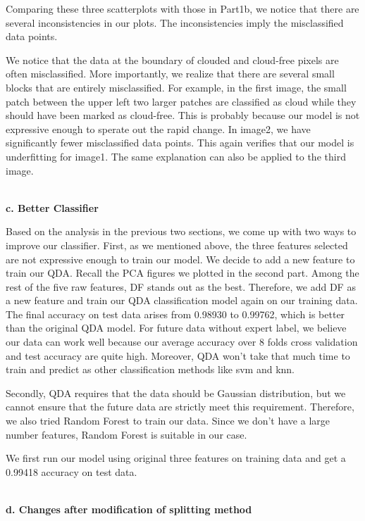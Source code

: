 \documentclass[11pt]{article}
\begin{document}
Comparing these three scatterplots with those in Part1b, we notice that there are several inconsistencies in our plots. The inconsistencies imply the misclassified data points. 

We notice that the data at the boundary of clouded and cloud-free pixels are often misclassified. More importantly, we realize that there are several small blocks that are entirely misclassified. For example, in the first image, the small patch between the upper left two larger patches are classified as cloud while they should have been marked as cloud-free. This is probably because our model is not expressive enough to sperate out the rapid change. In image2, we have significantly fewer misclassified data points. This again verifies that our model is underfitting for image1. The same explanation can also be applied to the third image.


\vspace{0.3cm}
\mbox{}\\
\textbf{c. Better Classifier}

Based on the analysis in the previous two sections, we come up with two ways to improve our classifier.
First, as we mentioned above, the three features selected are not expressive enough to train our model. We decide to add a new feature to train our QDA. Recall the PCA figures we plotted in the second part. Among the rest of the five raw features, DF stands out as the best. Therefore, we add DF as a new feature and train our QDA classification model again on our training data. The final accuracy on test data arises from 0.98930 to 0.99762, which is better than the original QDA model. For future data without expert label, we believe our data can work well because our average accuracy over 8 folds cross validation and test accuracy are quite high. Moreover, QDA won't take that much time to train and predict as other classification methods like svm and knn.

Secondly, QDA requires that the data should be Gaussian distribution, but we cannot ensure that the future data are strictly meet this requirement. Therefore, we also tried Random Forest to train our data. Since we don't have a large number features, Random Forest is suitable in our case.

We first run our model using original three features on training data and get a 0.99418 accuracy on test data.

\vspace{0.3cm}
\mbox{}\\
\textbf{d. Changes after modification of splitting method}
\end{document}
